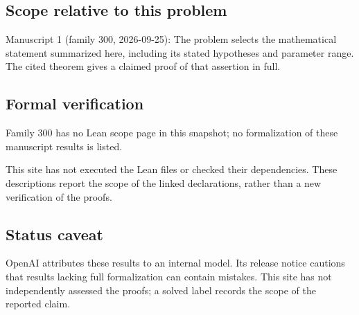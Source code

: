 \documentclass[11pt]{article}
\begin{document}
\subsection{Scope relative to this problem}
Manuscript 1 (family 300, 2026-09-25): The problem selects the mathematical statement summarized here, including its stated hypotheses and parameter range. The cited theorem gives a claimed proof of that assertion in full.

\subsection{Formal verification}
Family 300 has no Lean scope page in this snapshot; no formalization of these manuscript results is listed.

This site has not executed the Lean files or checked their dependencies. These descriptions report the scope of the linked declarations, rather than a new verification of the proofs.

\subsection{Status caveat}
OpenAI attributes these results to an internal model. Its release notice cautions that results lacking full formalization can contain mistakes. This site has not independently assessed the proofs; a solved label records the scope of the reported claim.
\end{document}
